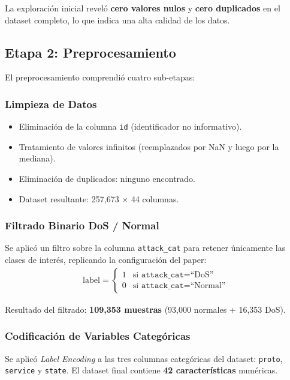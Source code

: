 \documentclass[12pt,a4paper]{article}
\begin{document}
La exploración inicial reveló \textbf{cero valores nulos} y \textbf{cero duplicados} en el
dataset completo, lo que indica una alta calidad de los datos.

\subsection{Etapa 2: Preprocesamiento}

El preprocesamiento comprendió cuatro sub-etapas:

\subsubsection{Limpieza de Datos}
\begin{itemize}
    \item Eliminación de la columna \texttt{id} (identificador no informativo).
    \item Tratamiento de valores infinitos (reemplazados por NaN y luego por la mediana).
    \item Eliminación de duplicados: ninguno encontrado.
    \item Dataset resultante: 257{,}673 $\times$ 44 columnas.
\end{itemize}

\subsubsection{Filtrado Binario DoS / Normal}
Se aplicó un filtro sobre la columna \texttt{attack\_cat} para retener únicamente las clases de interés,
replicando la configuración del paper:
\begin{align*}
    \text{label} = \begin{cases} 1 & \text{si } \texttt{attack\_cat} = \text{``DoS''} \\ 0 & \text{si } \texttt{attack\_cat} = \text{``Normal''} \end{cases}
\end{align*}

Resultado del filtrado: \textbf{109{,}353 muestras} (93{,}000 normales + 16{,}353 DoS).

\subsubsection{Codificación de Variables Categóricas}
Se aplicó \textit{Label Encoding} a las tres columnas categóricas del dataset:
\texttt{proto}, \texttt{service} y \texttt{state}. El dataset final contiene \textbf{42 características} numéricas.
\end{document}
